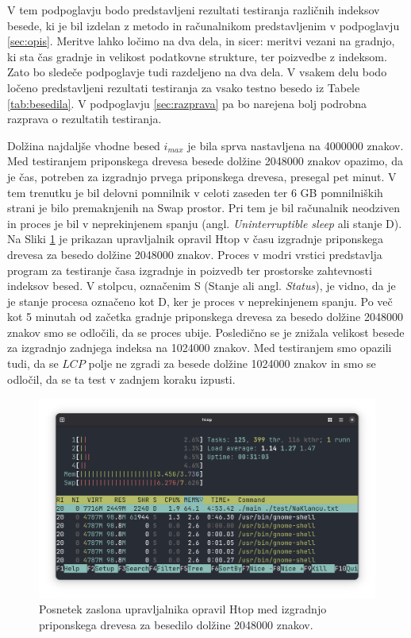 V tem podpoglavju bodo predstavljeni rezultati testiranja različnih indeksov besede, ki je bil izdelan z metodo in računalnikom predstavljenim v podpoglavju \ref{sec:opis}. Meritve lahko ločimo na dva dela, in sicer: meritvi vezani na gradnjo, ki sta čas gradnje in velikost podatkovne strukture, ter poizvedbe z indeksom. Zato bo sledeče podpoglavje tudi razdeljeno na dva dela. V vsakem delu bodo ločeno predstavljeni rezultati testiranja za vsako testno besedo iz Tabele \ref{tab:besedila}. V podpoglavju \ref{sec:razprava} pa bo narejena bolj podrobna razprava o rezultatih testiranja.

Dolžina najdaljše vhodne besed $i_{max}$ je bila sprva nastavljena na 4000000 znakov. Med testiranjem priponskega drevesa besede dolžine 2048000 znakov opazimo, da je čas, potreben za izgradnjo prvega priponskega drevesa, presegal pet minut. V tem trenutku je bil delovni pomnilnik v celoti zaseden ter 6 GB pomnilniških strani je bilo premaknjenih na Swap prostor. Pri tem je bil računalnik neodziven in proces je bil v neprekinjenem spanju (angl. \textit{Uninterruptible sleep} ali stanje D). Na Sliki \ref{fig:6GB} je prikazan upravljalnik opravil Htop v času izgradnje priponskega drevesa za besedo dolžine 2048000 znakov. Proces v modri vrstici predstavlja program za testiranje časa izgradnje in poizvedb ter prostorske zahtevnosti indeksov besed. V stolpcu, označenim S (Stanje ali angl. \textit{Status}), je vidno, da je je stanje procesa označeno kot D, ker je proces v neprekinjenem spanju. Po več kot 5 minutah od začetka gradnje priponskega drevesa za besedo dolžine 2048000 znakov smo se odločili, da se proces ubije. Posledično se je znižala velikost besede za izgradnjo zadnjega indeksa na 1024000 znakov. Med testiranjem smo opazili tudi, da se $LCP$ polje ne zgradi za besede dolžine 1024000 znakov in smo se odločil, da se ta test v zadnjem koraku izpusti.

\begin{figure}[tb]
    \centering
    \includegraphics[width=\textwidth]{Slike/Zaslonski posnetek 2025-06-23 22-53-56.png}

    \caption{Posnetek zaslona upravljalnika opravil Htop med izgradnjo priponskega drevesa za besedilo dolžine 2048000 znakov.} 
    \label{fig:6GB}
\end{figure}


